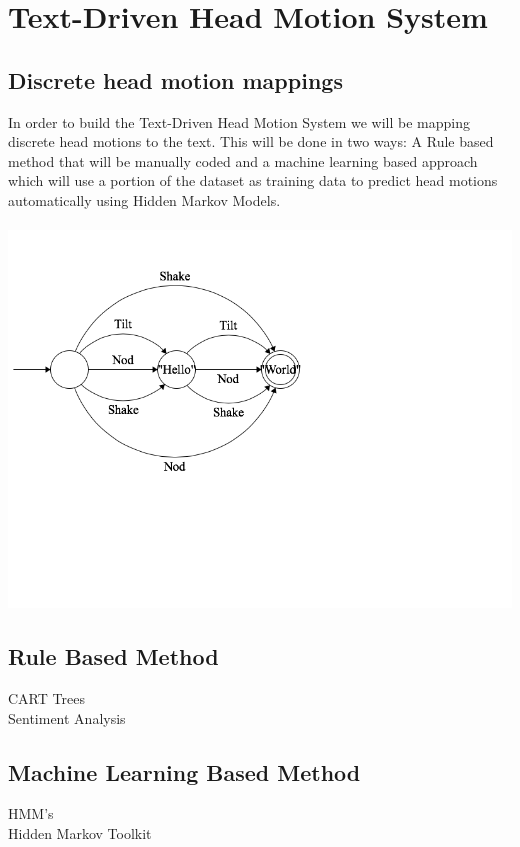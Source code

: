 \documentclass[bsc,frontabs,twoside,singlespacing,parskip]{infthesis}
\begin{document}
\chapter{Text-Driven Head Motion System}
\section{Discrete head motion mappings}
In order to build the Text-Driven Head Motion System we will be mapping discrete head motions to the text. This will be done in two ways: A Rule based method that will be manually coded and a machine learning based approach which will use a portion of the dataset as training data to predict head motions automatically using Hidden Markov Models.
\\
\\
\includegraphics[scale=0.5]{fsm}
\section{Rule Based Method}
CART Trees
\\
Sentiment Analysis
\section{Machine Learning Based Method}
HMM's
\\
Hidden Markov Toolkit
\end{document}
